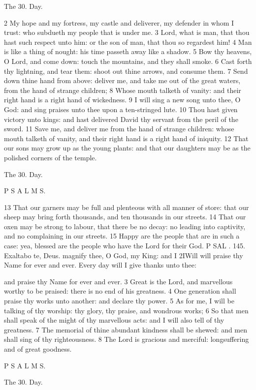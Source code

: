 The 30. Day.

2 My hope and my fortress, my castle and deliverer, my defender in whom I trust: who subdueth my people that is under me. 3 Lord, what is man, that thou hast such respect unto him: or the son of man, that thou so regardest him! 4 Man is like a thing of nought: his time passeth away like a shadow. 5 Bow thy heavens, O Lord, and come down: touch the mountains, and they shall smoke. 6 Cast forth thy lightning, and tear them: shoot out thine arrows, and consume them. 7 Send down thine hand from above: deliver me, and take me out of the great waters, from the hand of strange children; 8 Whose mouth talketh of vanity: and their right hand is a right hand of wickedness. 9 I will sing a new song unto thee, O God: and sing praises unto thee upon a ten-stringed lute. 10 Thou hast given victory unto kings: and hast delivered David thy servant from the peril of the sword. 11 Save me, and deliver me from the hand of strange children: whose mouth talketh of vanity, and their right hand is a right hand of iniquity. 12 That our sons may grow up as the young plants: and that our daughters may be as the polished corners of the temple.

The 30. Day.

P S A L M S.

13 That our garners may be full and plenteous with all manner of store: that our sheep may bring forth thousands, and ten thousands in our streets. 14 That our oxen may be strong to labour, that there be no decay: no leading into captivity, and no complaining in our streets. 15 Happy are the people that are in such a case: yea, blessed are the people who have the Lord for their God. P SAL . 145. Exaltabo te, Deus. magnify thee, O God, my King: and I 2IWill will praise thy Name for ever and ever. Every day will I give thanks unto thee:

and praise thy Name for ever and ever. 3 Great is the Lord, and marvellous worthy to be praised: there is no end of his greatness. 4 One generation shall praise thy works unto another: and declare thy power. 5 As for me, I will be talking of thy worship: thy glory, thy praise, and wondrous works; 6 So that men shall speak of the might of thy marvellous acts: and I will also tell of thy greatness. 7 The memorial of thine abundant kindness shall be shewed: and men shall sing of thy righteousness. 8 The Lord is gracious and merciful: longsuffering and of great goodness.

P S A L M S.

The 30. Day.

